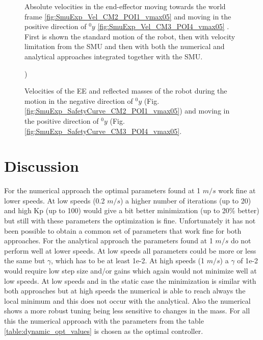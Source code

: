 \begin{figure}[htp!]
	\centering	
	 	 	
		\caption{Absolute velocities in the end-effector moving towards the world frame \ref{fig:SmuExp_Vel_CM2_POI1_vmax05} and moving in the positive direction of ${}^{0}_{}y$ \ref{fig:SmuExp_Vel_CM3_POI4_vmax05} . First is shown the standard motion of the robot, then with velocity limitation from the SMU and then with both the numerical and analytical approaches integrated together with the SMU.}
	\label{fig:SmuExp_Vel_vmax05}
\end{figure}




\begin{figure}[htp!]
	\centering	
	 	 	
	\caption{Velocities of the EE and reflected masses of the robot during the motion in the negative direction of ${}^{0}_{}y$   (Fig.\ref{fig:SmuExp_SafetyCurve_CM2_POI1_vmax05}) and moving in the positive direction of ${}^{0}_{}y$  (Fig.\ref{fig:SmuExp_SafetyCurve_CM3_POI4_vmax05}.})
	\label{fig:SmuExp_SafetyCurve_vmax05}
\end{figure}


\section{Discussion}


For the numerical approach the optimal parameters found at 1 $m/s$ work fine at lower speeds. At low speeds (0.2 $m/s$) a higher number of iterations (up to 20) and high Kp (up to 100) would give a bit better minimization (up to 20\% better) but still with these parameters the optimization is fine.
%
Unfortunately it has not been possible to obtain a common set of parameters that work fine for both approaches. For the analytical approach the parameters found at 1 $m/s$ do not perform well at lower speeds. At low speeds all parameters could be more or less the same but $\gamma$, which has to be at least 1e-2. At high speeds (1 $m/s$) a $\gamma$ of 1e-2 would require low step size and/or gains which again would not minimize well at low speeds. 
%
At low speeds and in the static case the minimization is similar with both approaches but at high speeds the numerical is able to reach always the local minimum and this does not occur with the analytical. Also the numerical shows a more robust tuning being less sensitive to changes in the mass. For all this the numerical approach with the parameters from the table \ref{table:dynamic_opt_values} is chosen as the optimal controller.


